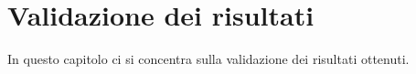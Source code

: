 \chapter{Validazione dei risultati}
\label{chapter:validation}
In questo capitolo ci si concentra sulla validazione dei risultati ottenuti.






